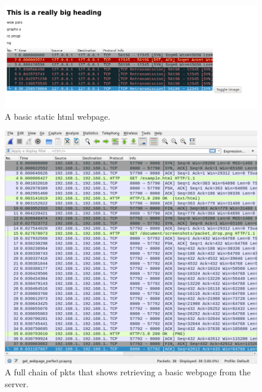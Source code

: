 \documentclass[titlepage]{article}
\begin{document}
\begin{figure}[H]
  \centering
  \includegraphics[width=\textwidth]{basic_webpage.png}
  \caption{%
    A basic static \gls{html} webpage.
  }\label{basicwebpage}
\end{figure}

\begin{figure}[H]
  \centering
  \includegraphics[width=\textwidth]{website_get.png}
  \caption{%
    A full chain of \glspl{pkt} that shows retrieving a basic webpage
    from the server.
  }\label{getrequest}
\end{figure}
\end{document}
